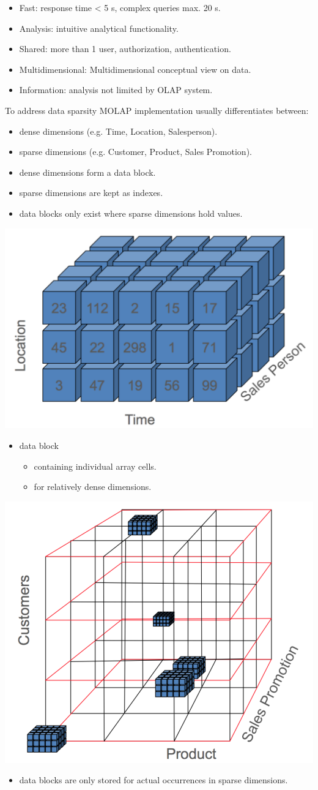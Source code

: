 \begin{breakbox}
\begin{itemize}
	\item \textcolor{Emerald}{F}ast: response time < 5 s, complex queries max. 20 s.
	\item \textcolor{Emerald}{A}nalysis: intuitive analytical functionality.
	\item \textcolor{Emerald}{S}hared: more than 1 user, authorization, authentication.
	\item \textcolor {Emerald}{M}ultidimensional: Multidimensional conceptual view on data.
	\item \textcolor{Emerald}{I}nformation: analysis not limited by OLAP system.
\end{itemize}
\end{breakbox}
\begin{breakbox}
\newline To address data sparsity MOLAP implementation usually differentiates between:
\begin{itemize}
	\item dense dimensions (e.g. Time, Location, Salesperson).
	\item sparse dimensions (e.g. Customer, Product, Sales Promotion).
	\item dense dimensions form a data block.
	\item sparse dimensions are kept as indexes.
	\item data blocks only exist where sparse dimensions hold values.
\end{itemize}
\begin{center}
\includegraphics[width=.05\textwidth]{slides_images/dense_molap.png}
\end{center}
\begin{itemize}
	\item data block
	\begin{itemize}
		\item containing individual array cells.
		\item for relatively dense dimensions.
	\end{itemize}
\end{itemize}
\begin{center}
\includegraphics[width=.05\textwidth]{slides_images/sparse_molap.png}
\end{center}
\begin{itemize}
	\item data blocks are only stored for actual occurrences in sparse dimensions.
\end{itemize}
\end{breakbox}

